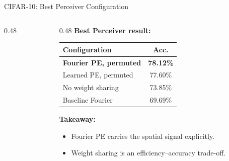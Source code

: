\documentclass[aspectratio=169,11pt]{beamer}
\begin{document}
\begin{frame}{CIFAR-10: Best Perceiver Configuration}
  \begin{columns}[T]
    \begin{column}{0.48\textwidth}
      \begin{center}
      \end{center}
    \end{column}
    \begin{column}{0.48\textwidth}
      \textbf{Best Perceiver result:}
      \begin{table}
        \centering\small
        \begin{tabular}{lc}
          \toprule
          \textbf{Configuration} & \textbf{Acc.} \\
          \midrule
          \textbf{Fourier PE, permuted} & \textbf{78.12\%} \\
          Learned PE, permuted & 77.60\% \\
          No weight sharing & 73.85\% \\
          Baseline Fourier & 69.69\% \\
          \bottomrule
        \end{tabular}
      \end{table}

      \vspace{0.35em}
      {\small
      \textbf{Takeaway:}
      \begin{itemize}
        \item Fourier PE carries the spatial signal explicitly.
        \item Weight sharing is an efficiency--accuracy trade-off.
      \end{itemize}
      }
    \end{column}
  \end{columns}
\end{frame}
\end{document}
